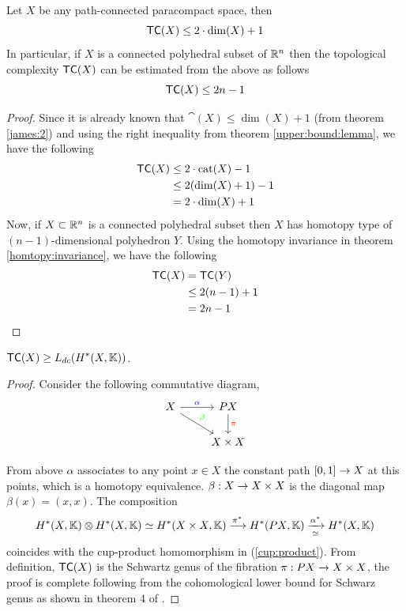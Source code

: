 \begin{thm}
    Let $X$ be any path-connected paracompact space, then
    \[
        \textsf{TC}(X) \le 2 \cdot \dim(X) + 1
    \]
    In particular, if $X$ is a connected polyhedral subset of $\mathbb{R}^n$ then the topological complexity $\textsf{TC}(X)$ can be estimated from the above as follows
    \[
        \textsf{TC}(X) \le 2n - 1
    \]
\end{thm}

\begin{proof}
    Since it is already known that $\cat(X) \le \dim(X) + 1$ (from theorem \ref{james:2}) and using the right inequality from theorem \ref{upper:bound:lemma}, we have the following
    \begin{align*}
        \textsf{TC}(X) & \le 2 \cdot \operatorname{cat}(X) - 1 \\
                  & \le 2 (\dim(X) + 1) - 1 \\
                  & = 2 \cdot \dim(X) + 1
    \end{align*}
    Now, if $X \subset \mathbb{R}^n$ is a connected polyhedral subset then $X$ has homotopy type of $(n-1)$-dimensional polyhedron $Y$. 
    Using the homotopy invariance in theorem \ref{homtopy:invariance}, we have the following
    \begin{align*}
        \textsf{TC}(X) & = \textsf{TC}(Y)    \\
                  & \le 2(n-1) + 1 \\
                  & = 2n - 1
    \end{align*}
\end{proof}

\begin{lem}\label{zdcl:bound}
    $\displaystyle \textsf{TC}(X) \ge L_{dc}(H^*(X, \mathbb{K}))$.
\end{lem}

\begin{proof}
    Consider the following commutative diagram,
    \[
        \begin{tikzcd}
            X \arrow[rd,"\beta" green] \arrow[r, "\alpha" blue] & PX \arrow[d, "\pi" red] \\
            & X \times X
        \end{tikzcd}
    \]

    From above $\alpha$ associates to any point $x \in X$ the constant path $[0,1] \rightarrow X$ at this points, which is a homotopy equivalence. 
    $\beta: X \rightarrow X \times X$ is the diagonal map $\beta(x) = (x,x)$. 
    The composition
    \begin{equation}
        H^*(X, \mathbb{K}) \otimes H^*(X, \mathbb{K}) \simeq H^*(X \times X, \mathbb{K}) \xrightarrow{\pi^*} H^*(PX, \mathbb{K}) \xrightarrow[\simeq]{\alpha^*} H^*(X, \mathbb{K})
    \end{equation}
    coincides with the cup-product homomorphism in (\ref{cup:product}). 
    From definition, $\textsf{TC}(X)$ is the Schwartz genus of the fibration $\pi: PX \rightarrow X \times X$, the proof is complete following from the cohomological lower bound for Schwarz genus as shown in theorem 4 of \cite{schwarz1961genus}.
\end{proof}

